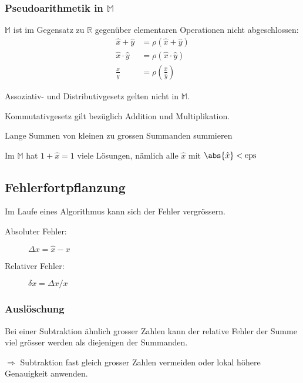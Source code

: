 		\subsubsection{Pseudoarithmetik in $\mathbb{M}$} $\mathbb{M}$ ist im Gegensatz zu $\mathbb{R}$ gegenüber elementaren Operationen nicht abgeschlossen:
			\begin{align*}
				\hat x + \hat y &= \rho(\hat x + \hat y) \\
				\hat x \cdot \hat y &= \rho(\hat x \cdot \hat y) \\
				\frac{\hat x}{\hat y} &= \rho\left(\frac{\hat x}{\hat y}\right)
			\end{align*}

			\begin{regeln}
				\item Assoziativ- und Distributivgesetz gelten nicht in $\mathbb{M}$.
				\item Kommutativgesetz gilt bezüglich Addition und Multiplikation.
			\end{regeln}

			\begin{folgerungen}
				\item Lange Summen von kleinen zu grossen Summanden summieren
				\item Im $\mathbb M$ hat $1 + \hat x = 1$ viele Lösungen, nämlich alle $\hat x$ mit $\abs{\hat x} < \mathrm{eps}$
			\end{folgerungen}

	\subsection{Fehlerfortpflanzung}
		Im Laufe eines Algorithmus kann sich der Fehler vergrössern.

		\begin{description}
			\item[Absoluter Fehler:] $\Delta x = \hat x - x$
			\item[Relativer Fehler:] $\delta x = \Delta x / x$
		\end{description}

		\subsubsection{Auslöschung}
			Bei einer Subtraktion ähnlich grosser Zahlen kann der relative Fehler der Summe viel grösser werden als diejenigen der Summanden.

			$\Rightarrow$ Subtraktion fast gleich grosser Zahlen vermeiden oder lokal höhere Genauigkeit anwenden.

